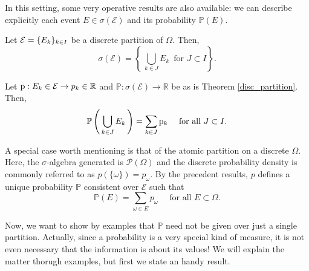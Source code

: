 In this setting, some very operative results are also available: we can describe explicitly each event $E\in\sigma(\mathcal{E})$ and its probability $\mathbb{P}(E)$.
\goodbreak\begin{my_lemma}
	\label{explicit_char1}
	Let $\mathcal{E}=\{ E_k \}_{k\in I}$ be a discrete partition of $\Omega$. Then,
	\[
		\sigma( \mathcal{E} ) = \left\{ \, \bigcup_{k \in J} E_k \, \text{ for }J \subset I \right\}.
	\]
\end{my_lemma}
\begin{my_lemma}
	\label{explicit_char2}
	Let $\mathrm{p} : E_k \in \mathcal{E} \to p_k \in \mathbb{R}$ and $\mathbb{P} : \sigma(\mathcal{E}) \to \mathbb{R}$ be as is Theorem \ref{disc_partition}. Then,
	\[
		\mathbb{P} \left( \, \bigcup_{k \in J} E_k \,\right) = \sum_{k \in J} \mathrm{p}_k \quad \text{ for all }J \subset I.
	\]
\end{my_lemma}
\begin{my_remark}
	A special case worth mentioning is that of the atomic partition on a discrete $\Omega$. 
	Here, the $\sigma$-algebra generated is $\mathcal{P}(\Omega)$ and the discrete probability density is commonly referred to as $p(\{ \omega \})=p_\omega$. 
	By the precedent results, $p$ defines a unique probability $\mathbb{P}$ consistent over $\mathcal{E}$ such that
	\begin{equation}
		\mathbb{P} \left( E \right) = \sum_{\omega \in E} p_\omega \quad \text{ for all }E \subset \Omega.		
	\end{equation}
\end{my_remark}
Now, we want to show by examples that $\mathbb{P}$ need not be given over just a single partition. Actually, since a probability is a very special kind of measure, it is not even necessary that the information is about its values! We will explain the matter thorugh examples, but first we state an handy result.
